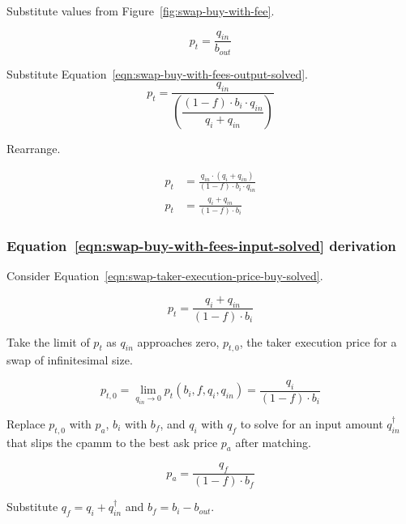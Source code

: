 \documentclass[table, twocolumn]{article}
\begin{document}
Substitute values from Figure~\ref{fig:swap-buy-with-fee}.

\begin{equation}
  p_t = \frac{q_{in}}{b_{out}}
\end{equation}

Substitute Equation~\ref{eqn:swap-buy-with-fees-output-solved}.
\begin{equation}
  p_t = \frac{q_{in}}{\left(\dfrac{(1 - f) \cdot b_i \cdot q_{in}}{q_i + q_{in}}\right)}
\end{equation}

Rearrange.

\begin{align}
  p_t & =
  \frac{q_{in} \cdot (q_i + q_{in})}{(1 - f) \cdot b_i \cdot q_{in}} \nonumber \\
  p_t & = \frac{q_i + q_{in}}{(1 - f) \cdot b_i} \nonumber
\end{align}

\subsubsection{Equation~\ref{eqn:swap-buy-with-fees-input-solved} derivation}%
\label{sssec:equation-eqn-swap-buy-with-fees-input-solved-derivation}

Consider Equation~\ref{eqn:swap-taker-execution-price-buy-solved}.

\begin{equation}
  p_t = \frac{q_i + q_{in}}{(1 - f) \cdot b_i} \nonumber
\end{equation}

Take the limit of $p_t$ as $q_{in}$ approaches zero, $p_{t, 0}$, the taker execution
price for a swap of infinitesimal size.

\begin{equation}
  p_{t, 0} = \lim_{q_{in} \to 0} p_t (b_i, f, q_i, q_{in}) =
  \frac{q_i}{(1 - f) \cdot b_i} \nonumber
\end{equation}

Replace $p_{t, 0}$ with $p_a$, $b_i$ with $b_f$, and $q_i$ with $q_f$ to solve for an
input amount $q_{in}^{\dagger}$ that slips the \gls*{cpamm} to the best ask price $p_a$
after matching.

\begin{equation}
  p_a = \frac{q_f}{(1 - f) \cdot b_f} \nonumber
\end{equation}

Substitute $q_f = q_i + q_{in}^{\dagger}$ and $b_f = b_i - b_{out}$.
\end{document}
